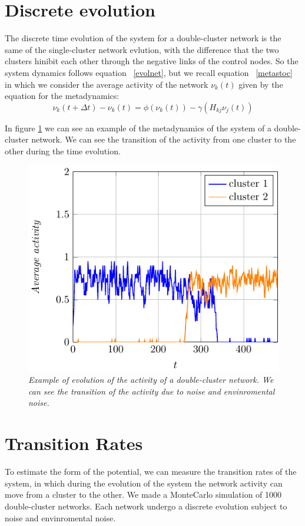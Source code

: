 \section{Discrete evolution}
The discrete time evolution of the system for a double-cluster network is the same of the single-cluster network evlution, with the difference that the two clusters hinibit each other through the negative links of the control nodes.
So the system dynamics follows equation ~\eqref{evolnet}, but we recall equation ~\eqref{metastoc} in which we consider the average activity of the network $\nu_k(t)$ given by the equation for the metadynamics:
$$
\nu_k(t+\Delta t)-\nu_k(t)=\phi(\nu_k(t))-\gamma\left (H_{kj}\nu_j(t)\right )
$$

In figure \ref{fig:metad} we can see an example of the metadynamics of the system of a double-cluster network. We can see the transition of the activity from one cluster to the other during the time evolution.
\begin{figure}[h]
\centering
\includegraphics[scale=1.4]{images/metad.pdf}
\caption{\emph{Example of evolution of the activity of a double-cluster network. We can see the transition of the activity due to noise and envinromental noise.}}
\label{fig:metad}
\end{figure}


\section{Transition Rates}
To estimate the form of the potential, we can measure the transition rates of the system, in which during the evolution of the system the network activity can move from a cluster to the other.
We made a MonteCarlo simulation of 1000 double-cluster networks. Each network undergo a discrete evolution subject to noise and envinromental noise.



